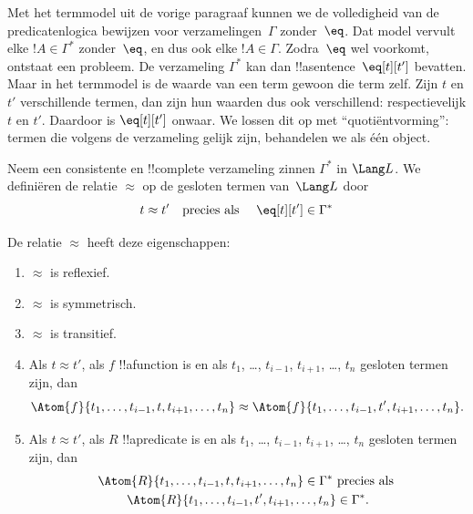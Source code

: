\documentclass[../../../include/open-logic-section]{subfiles}
\begin{document}

\begin{explain}
Met het termmodel uit de vorige paragraaf kunnen we de volledigheid van
de predicatenlogica bewijzen voor verzamelingen~$\Gamma$ zonder~$\eq$.
Dat model vervult elke $!A \in \Gamma^*$ zonder~$\eq$, en dus ook elke
$!A \in \Gamma$. Zodra~$\eq$ wel voorkomt, ontstaat een probleem.
De verzameling $\Gamma^*$ kan dan !!a{sentence}~$\eq[t][t']$ bevatten.
Maar in het termmodel is de waarde van een term gewoon die term zelf.
Zijn $t$ en $t'$ verschillende termen, dan zijn hun waarden dus ook
verschillend: respectievelijk $t$ en $t'$. Daardoor is $\eq[t][t']$
onwaar. We lossen dit op met ``quotiëntvorming'': termen die volgens de
verzameling gelijk zijn, behandelen we als één object.
\end{explain}

\begin{defn}
  Neem een consistente en !!{complete} verzameling zinnen $\Gamma^*$ in
  $\Lang L$. We definiëren de relatie $\approx$ op de gesloten termen
  van~$\Lang L$ door
  \[
  t \approx t' \text{\quad precies als \quad} \eq[t][t'] \in \Gamma^*
  \]
\end{defn}

\begin{prop}
De relatie $\approx$ heeft deze eigenschappen:
\begin{enumerate}
\item $\approx$ is reflexief.
\item $\approx$ is symmetrisch.
\item  $\approx$ is transitief.
\item Als $t \approx t'$, als $f$ !!a{function} is en als $t_1$, \dots,
  $t_{i-1}$, $t_{i+1}$, \dots, $t_n$ gesloten termen zijn, dan
\[
\Atom{f}{t_1,\dots, t_{i-1}, t, t_{i+1}, \dots, t_n} \approx
\Atom{f}{t_1,\dots, t_{i-1}, t', t_{i+1}, \dots, t_n}.
\]
\item Als $t \approx t'$, als $R$ !!a{predicate} is en als $t_1$, \dots,
  $t_{i-1}$, $t_{i+1}$, \dots, $t_n$ gesloten termen zijn, dan
\begin{multline*}
\Atom{R}{t_1,\dots, t_{i-1}, t, t_{i+1}, \dots, t_n} \in \Gamma^* \text{ precies als } \\
\Atom{R}{t_1,\dots, t_{i-1}, t', t_{i+1}, \dots, t_n} \in \Gamma^*.
\end{multline*}
\end{enumerate}
\end{prop}
\end{document}

